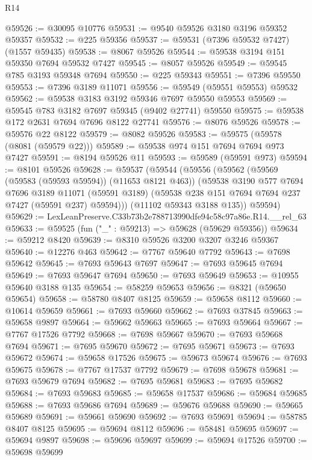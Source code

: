 \begin{lexlean}{R14}
\begin{coremodule}
@59526 := @30095 @10776
@59531 := @9540 @59526 @3180 @3196 @59352 @59357
@59532 := @225 @59356
@59537 := @59531 (@7396 @59532 @7427) (@1557 @59435)
@59538 := @8067 @59526
@59544 := @59538 @3194 @151 @59350 @7694 @59532 @7427
@59545 := @8057 @59526
@59549 := @59545 @785 @3193 @59348 @7694
@59550 := @225 @59343
@59551 := @7396 @59550
@59553 := @7396 @3189 @11071
@59556 := @59549 (@59551 @59553) @59532
@59562 := @59538 @3183 @3192 @59346 @7697 @59550 @59553
@59569 := @59545 @783 @3182 @7697 @59345 (@9402 @27741) @59550
@59575 := @59538 @172 @2631 @7694 @7696 @8122 @27741
@59576 := @8076 @59526
@59578 := @59576 @22 @8122
@59579 := @8082 @59526
@59583 := @59575 (@59578 (@8081 (@59579 @22)))
@59589 := @59538 @974 @151 @7694 @7694 @973 @7427
@59591 := @8194 @59526 @11
@59593 := @59589 (@59591 @973)
@59594 := @8101 @59526
@59628 := @59537
    (@59544
      (@59556
        (@59562
          (@59569 (@59583 (@59593 @59594)) (@11653 @8121 @463))
          (@59538
            @3190
            @577
            @7694
            @7696
            @3189
            @11071
            (@59591 @3189)
            (@59538 @238 @151 @7694 @7694 @237 @7427 (@59591 @237) @59594)))
        (@11102 @59343 @3188 @135))
      @59594)
@59629 := LexLeanPreserve.C33b73b2e788713990dfe94c58c97a86e.R14.__rel_63
@59633 := @59525 (fun ("_" : @59213) => @59628 (@59629 @59356))
@59634 := @59212 @8420
@59639 := @8310 @59526 @3200 @3207 @3246 @59367
@59640 := @12276 @463
@59642 := @7767 @59640 @7792
@59643 := @7698 @59642
@59645 := @7693 @59643 @7697
@59647 := @7693 @59645 @7694
@59649 := @7693 @59647 @7694
@59650 := @7693 @59649
@59653 := @10955 @59640 @3188 @135
@59654 := @58259 @59653
@59656 := @8321 (@59650 @59654)
@59658 := @58780 @8407 @8125
@59659 := @59658 @8112
@59660 := @10614 @59659
@59661 := @7693 @59660
@59662 := @7693 @37845
@59663 := @59658 @9897
@59664 := @59662 @59663
@59665 := @7693 @59664
@59667 := @7767 @17526 @7792
@59668 := @7698 @59667
@59670 := @7693 @59668 @7694
@59671 := @7695 @59670
@59672 := @7695 @59671
@59673 := @7693 @59672
@59674 := @59658 @17526
@59675 := @59673 @59674
@59676 := @7693 @59675
@59678 := @7767 @17537 @7792
@59679 := @7698 @59678
@59681 := @7693 @59679 @7694
@59682 := @7695 @59681
@59683 := @7695 @59682
@59684 := @7693 @59683
@59685 := @59658 @17537
@59686 := @59684 @59685
@59688 := @7693 @59686 @7694
@59689 := @59676 @59688
@59690 := @59665 @59689
@59691 := @59661 @59690
@59692 := @7693 @59691
@59694 := @58785 @8407 @8125
@59695 := @59694 @8112
@59696 := @58481 @59695
@59697 := @59694 @9897
@59698 := @59696 @59697
@59699 := @59694 @17526
@59700 := @59698 @59699

\end{coremodule}
\end{lexlean}
